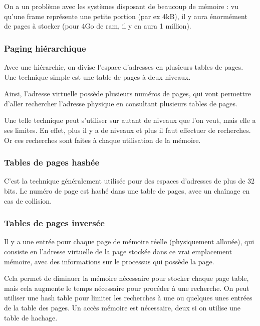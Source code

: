 	On a un problème avec les systèmes disposant de beaucoup de mémoire : vu qu'une frame représente une petite portion (par ex 4kB), il y aura énormément de pages à stocker (pour 4Go de ram, il y en aura 1 million).
	
	\subsubsection{Paging hiérarchique}
	
	Avec une hiérarchie, on divise l'espace d'adresses en plusieurs tables de pages. Une technique simple est une table de pages à deux niveaux.
	
	
	Ainsi, l'adresse virtuelle possède plusieurs numéros de pages, qui vont permettre d'aller rechercher l'adresse physique en consultant plusieurs tables de pages.
	
	
	Une telle technique peut s'utiliser sur autant de niveaux que l'on veut, mais elle a ses limites. En effet, plus il y a de niveaux et plus il faut effectuer de recherches. Or ces recherches sont faites à chaque utilisation de la mémoire.
	
	\subsubsection{Tables de pages hashée}
	
	C'est la technique généralement utilisée pour des espaces d'adresses de plus de 32 bits. Le numéro de page est hashé dans une table de pages, avec un chaînage en cas de collision.
	
	
	\subsubsection{Tables de pages inversée}
	
	Il y a une entrée pour chaque page de mémoire réelle (physiquement allouée), qui consiste en l'adresse virtuelle de la page stockée dans ce vrai emplacement mémoire, avec des informations sur le processus qui possède la page.
	
	Cela permet de diminuer la mémoire nécessaire pour stocker chaque page table, mais cela augmente le temps nécessaire pour procéder à une recherche. On peut utiliser une hash table pour limiter les recherches à une ou quelques unes entrées de la table des pages. Un accès mémoire est nécessaire, deux si on utilise une table de hachage.
	
